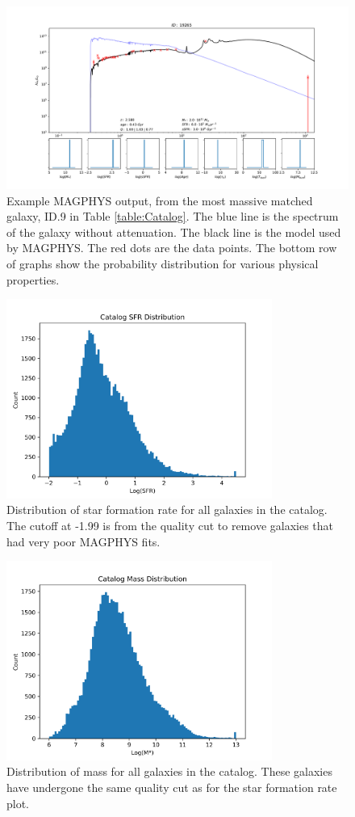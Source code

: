 \begin{figure}[tbp]
\centering \includegraphics[width=180mm]{19265.pdf}
\caption{Example MAGPHYS output, from the most massive matched galaxy, ID.9 in Table \ref{table:Catalog}. The blue line is the spectrum of the galaxy without attenuation. The black line is the model used by MAGPHYS. The red dots are the data points. The bottom row of graphs show the probability distribution for various physical properties.}
\label{fig:MAGPHYS_Example}
\end{figure}

\begin{figure}[!tbp]
\centering \includegraphics[width=87mm]{Survey/MAGPHYS_SFR.png}
\caption{Distribution of star formation rate for all galaxies in the catalog. The cutoff at -1.99 is from the quality cut to remove galaxies that had very poor MAGPHYS fits.}
\label{fig:MAGPHYS_SFR}
\end{figure}

\begin{figure}[!tbp]
\centering \includegraphics[width=87mm]{Survey/MAGPHYS_Mstar.png}
\caption{Distribution of mass for all galaxies in the catalog. These galaxies have undergone the same quality cut as for the star formation rate plot.}
\label{fig:MAGPHYS_Mstar}
\end{figure}


